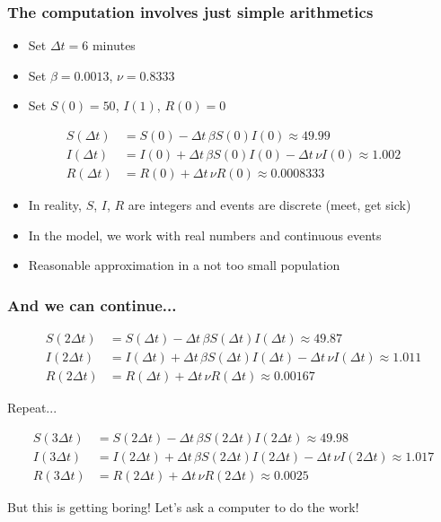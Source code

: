 \documentclass{beamer}
\begin{document}
\begin{frame}
\frametitle{The computation involves just simple arithmetics}

\begin{itemize}
 \item Set $\Delta t=6$ minutes

 \item Set $\beta =0.0013$, $\nu =0.8333$

 \item Set $S(0)=50$, $I(1)$, $R(0)=0$
\end{itemize}

\noindent
\begin{align*}
S(\Delta t) &= S(0) - \Delta t\,\beta S(0)I(0)\approx 49.99\\
I(\Delta t) &= I(0) + \Delta t\,\beta S(0)I(0) -\Delta t\,\nu I(0)\approx 1.002\\
R(\Delta t) &= R(0) + \Delta t\,\nu R(0)\approx 0.0008333
\end{align*}

\begin{itemize}
 \item<2-> In reality, $S$, $I$, $R$ are integers and events are discrete (meet, get sick)

 \item<3-> In the model, we work with real numbers and continuous events

 \item<4-> Reasonable approximation in a not too small population
\end{itemize}

\noindent
\end{frame}

\begin{frame}
\frametitle{And we can continue...}

\begin{align*}
S(2\Delta t) &= S(\Delta t) - \Delta t\,\beta S(\Delta t)I(\Delta t)\approx 49.87\\
I(2\Delta t) &= I(\Delta t) + \Delta t\,\beta S(\Delta t)I(\Delta t) -\Delta t\,\nu I(\Delta t)\approx 1.011\\
R(2\Delta t) &= R(\Delta t) + \Delta t\,\nu R(\Delta t)\approx 0.00167
\end{align*}

Repeat...

\begin{align*}
S(3\Delta t) &= S(2\Delta t) - \Delta t\,\beta S(2\Delta t)I(2\Delta t)\approx 49.98\\
I(3\Delta t) &= I(2\Delta t) + \Delta t\,\beta S(2\Delta t)I(2\Delta t) -\Delta t\,\nu I(2\Delta t)\approx 1.017\\
R(3\Delta t) &= R(2\Delta t) + \Delta t\,\nu R(2\Delta t)\approx 0.0025
\end{align*}


\pause
\begin{block}{}
But this is getting boring! Let's ask a computer to do the work!
\end{block}
\end{frame}
\end{document}
